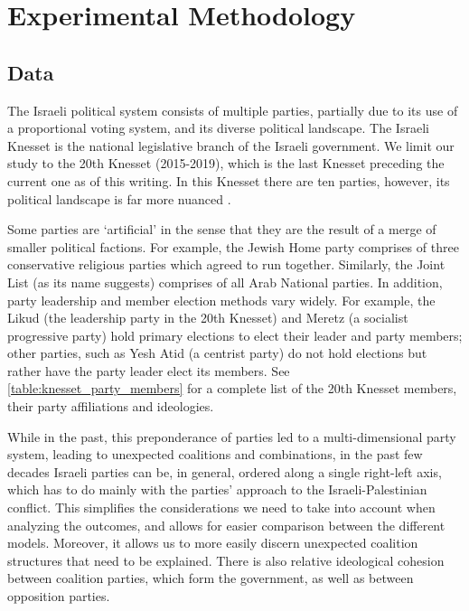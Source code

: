 
\chapter{Experimental Methodology}
\label{ch:experiment}

\section{Data}
\label{sec:data}

The Israeli political system consists of multiple parties, partially due to its
use of a proportional voting system, and its diverse political landscape.
The Israeli Knesset is the national legislative branch of the Israeli government.
We limit our study to the 20th Knesset (2015-2019), which is the last Knesset
preceding the current one as of this writing.
In this Knesset there are ten parties, however, its political landscape is far
more nuanced \cite{knesset:20thknesset, knesset:20thknessetFactions,
wiki:20thknesset}.

Some parties are `artificial' in the sense that they are the result of a merge
of smaller political factions.
For example, the Jewish Home party comprises of three conservative religious
parties which agreed to run together.
Similarly, the Joint List (as its name suggests) comprises of all Arab National
parties.
In addition, party leadership and member election methods vary widely.
For example, the Likud (the leadership party in the 20th Knesset) and Meretz
(a socialist progressive party) hold primary elections to elect their leader
and party members; other parties, such as Yesh Atid (a centrist party) do not
hold elections but rather have the party leader elect its members.
See \autoref{table:knesset_party_members} for a complete list of the 20th Knesset
members, their party affiliations and ideologies.

While in the past, this preponderance of parties led to a multi-dimensional
party system, leading to unexpected coalitions and combinations,
in the past few decades Israeli parties can be, in general,
ordered along a single right-left axis, which has to do mainly with
the parties' approach to the Israeli-Palestinian conflict.
This simplifies the considerations we need to take into account when analyzing
the outcomes, and allows for easier comparison between the different models.
Moreover, it allows us to more easily discern
unexpected coalition structures that need to be explained.
There is also relative ideological cohesion between coalition parties, which
form the government, as well as between opposition parties.

